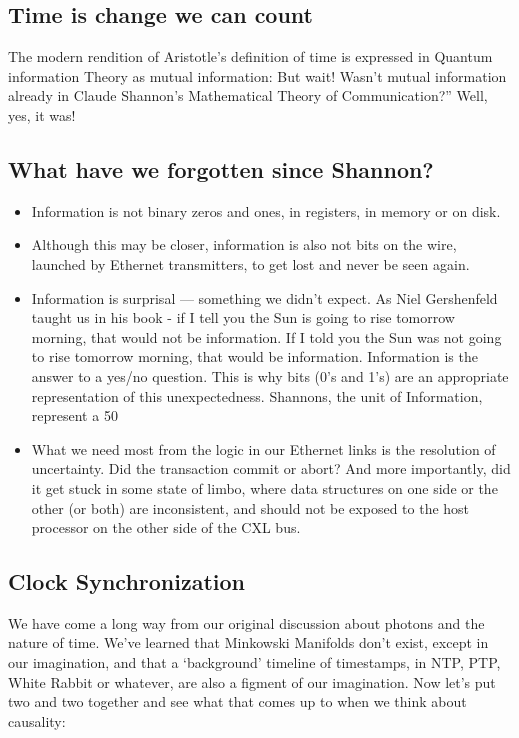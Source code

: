 \subsection{Time is change we can count}
The modern rendition of Aristotle’s definition of time is expressed in Quantum information Theory as mutual information: But wait! Wasn’t mutual information already in Claude Shannon’s Mathematical Theory of Communication?” Well, yes, it was!

\subsection{What have we  forgotten since Shannon?}
\begin{itemize}
  \item Information is not binary zeros and ones, in registers, in memory or on disk.
  \item Although this may be closer, information is also not bits on the wire, launched by Ethernet transmitters, to get lost and never be seen again.
  \item Information is surprisal — something we didn’t expect. As Niel Gershenfeld taught us in his book - if I tell you the Sun is going to rise tomorrow morning, that would not be information. If I told you the Sun was not going to rise tomorrow morning, that would be information.
Information is the answer to a yes/no question. This is why bits (0’s and 1’s) are an appropriate representation of this unexpectedness. Shannons, the unit of Information, represent a 50%
  \item What we need most from the logic in our Ethernet links is the resolution of uncertainty. Did the transaction commit or abort? And more importantly, did it get stuck in some state of limbo, where data structures on one side or the other (or both) are inconsistent, and should not be exposed to the host processor on the other side of the CXL bus.
\end{itemize}

\subsection{Clock Synchronization}
We have come a long way from our original discussion about photons and the nature of time. We’ve learned that Minkowski Manifolds don’t exist, except in our imagination, and that a ‘background’ timeline of timestamps, in NTP, PTP, White Rabbit or whatever, are also a figment of our imagination. Now let’s put two and two together and see what that comes up to when we think about causality:

